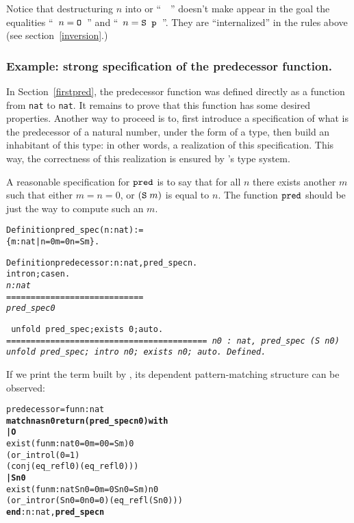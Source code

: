 \documentclass[11pt]{article}
\begin{document}
Notice that destructuring $n$ into  or ``~~''
 doesn't
make appear in the goal the equalities ``~$n=\mbox{\texttt{O}}$~''
 and ``~$n=\mbox{\texttt{S p}}$~''.
They are ``internalized'' in the rules above (see section~\ref{inversion}.)

\subsubsection{Example: strong specification of the predecessor function.}

In Section~\ref{firstpred}, the predecessor function was defined directly
as a function from \texttt{nat} to \texttt{nat}. It remains to prove
that this function has some desired properties. Another way to proceed
is to, first introduce a specification of what is the predecessor of a
natural number, under the form of a {\coq} type, then build an inhabitant
of this type: in other words, a realization of this specification. This way, the correctness
of this realization is ensured by {\coq}'s type system.

A reasonable specification for $\texttt{pred}$ is to say that for all $n$
there exists another $m$ such that either $m=n=0$, or $(\texttt{S}\;m)$
is equal to  $n$. The function $\texttt{pred}$ should be just the way to
compute such an $m$.

\begin{alltt}
Definition pred_spec (n:nat) :=
   \{m:nat | n=0{\coqand} m=0 {\coqor} n = S m\}.

Definition  predecessor : {\prodsym} n:nat, pred_spec n.
 intro n; case n.
\it{}
  n : nat
  ============================
   pred_spec 0

\tt{} unfold pred_spec;exists 0;auto.
\it{}
 =========================================
 {\prodsym} n0 : nat, pred_spec (S n0)
\tt{}
 unfold pred_spec; intro n0; exists n0; auto.
Defined.
\end{alltt}

If we print the term built by {\coq}, its dependent pattern-matching structure can be observed:

\begin{alltt}
predecessor =  fun n : nat {\funarrow}
\textbf{match n as n0 return (pred_spec n0) with}
\textbf{| O {\funarrow}}
    exist (fun m : nat {\funarrow} 0 = 0 {\coqand} m = 0 {\coqor} 0 = S m) 0
      (or_introl (0 = 1)
                 (conj (eq_refl 0) (eq_refl 0)))
\textbf{| S n0 {\funarrow}}
    exist (fun m : nat {\funarrow} S n0 = 0 {\coqand} m = 0 {\coqor} S n0 = S m) n0
      (or_intror (S n0 = 0 {\coqand} n0 = 0) (eq_refl (S n0)))
\textbf{end}  : {\prodsym} n : nat, \textbf{pred_spec n}
\end{alltt}
\end{document}
